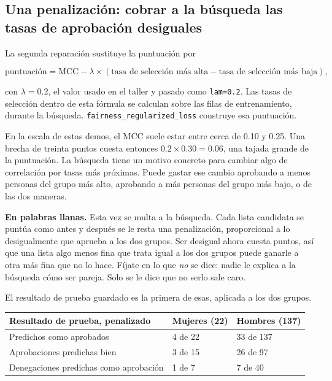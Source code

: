 \documentclass[11pt]{article}
\newcommand{\fn}[1]{\texttt{\small #1}}
\begin{document}
\subsection{Una penalización: cobrar a la búsqueda las tasas de aprobación desiguales}

La segunda reparación sustituye la puntuación por

\[
\text{puntuación}
=
\mathrm{MCC}
-
\lambda
\times
(\text{tasa de selección más alta} - \text{tasa de selección más baja}),
\]

con \(\lambda = 0.2\), el valor usado en el taller y pasado como \fn{lam=0.2}. Las tasas de selección dentro de esta fórmula se calculan sobre las filas de entrenamiento, durante la búsqueda. \fn{fairness\_regularized\_loss} construye esa puntuación.

En la escala de estas demos, el MCC suele estar entre cerca de 0.10 y 0.25. Una brecha de treinta puntos cuesta entonces \(0.2 \times 0.30 = 0.06\), una tajada grande de la puntuación. La búsqueda tiene un motivo concreto para cambiar algo de correlación por tasas más próximas. Puede gastar ese cambio aprobando a menos personas del grupo más alto, aprobando a más personas del grupo más bajo, o de las dos maneras.

\begin{plainwords}
\textbf{En palabras llanas.} Esta vez se multa a la búsqueda. Cada lista candidata se puntúa como antes y después se le resta una penalización, proporcional a lo desigualmente que aprueba a los dos grupos. Ser desigual ahora cuesta puntos, así que una lista algo menos fina que trata igual a los dos grupos puede ganarle a otra más fina que no lo hace. Fíjate en lo que \emph{no} se dice: nadie le explica a la búsqueda cómo ser pareja. Solo se le dice que no serlo sale caro.
\end{plainwords}

El resultado de prueba guardado es la primera de esas, aplicada a los dos grupos.

\begin{table}[H]
\centering
\small
\begin{tabularx}{\textwidth}{@{}l Y Y@{}}
\toprule
Resultado de prueba, penalizado & Mujeres (22) & Hombres (137) \\
\midrule
Predichos como aprobados & 4 de 22 & 33 de 137 \\
Aprobaciones predichas bien & 3 de 15 & 26 de 97 \\
Denegaciones predichas como aprobación & 1 de 7 & 7 de 40 \\
\bottomrule
\end{tabularx}
\end{table}
\end{document}
